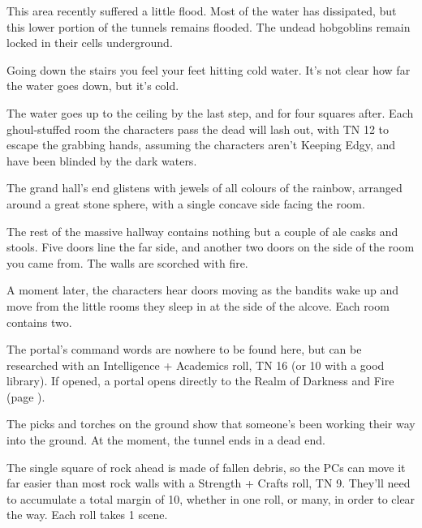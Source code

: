 \begin{multicols}{2}

This area recently suffered a little flood.  Most of the water has dissipated, but this lower portion of the tunnels remains flooded.  The undead hobgoblins remain locked in their cells underground.


\begin{boxtext}
	Going down the stairs you feel your feet hitting cold water.  It's not clear how far the water goes down, but it's cold.
\end{boxtext}

The water goes up to the ceiling by the last step, and for four squares after.  Each ghoul-stuffed room the characters pass the dead will lash out, with TN 12 to escape the grabbing hands, assuming the characters aren't Keeping Edgy, and have been blinded by the dark waters.



\begin{boxtext}
	The grand hall's end glistens with jewels of all colours of the rainbow, arranged around a great stone sphere, with a single concave side facing the room.

	The rest of the massive hallway contains nothing but a couple of ale casks and stools.  Five doors line the far side, and another two doors on the side of the room you came from.  The walls are scorched with fire.

\end{boxtext}

A moment later, the characters hear doors moving as the bandits wake up and move from the little rooms they sleep in at the side of the alcove.  Each room contains two.

The portal's command words are nowhere to be found here, but can be researched with an Intelligence + Academics roll, TN 16 (or 10 with a good library).  If opened, a portal opens directly to the Realm of Darkness and Fire (page \pageref{darknessandfire}).

\sewerking


\begin{boxtext}
	The picks and torches on the ground show that someone's been working their way into the ground.  At the moment, the tunnel ends in a dead end.
\end{boxtext}
 
The single square of rock ahead is made of fallen debris, so the PCs can move it far easier than most rock walls with a Strength + Crafts roll, TN 9.  They'll need to accumulate a total margin of 10, whether in one roll, or many, in order to clear the way.  Each roll takes 1 scene.


\end{multicols}
